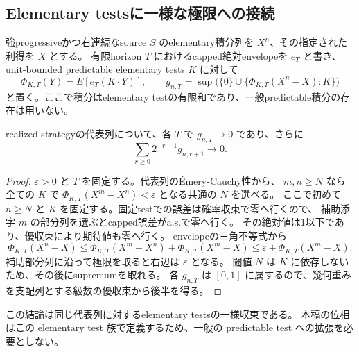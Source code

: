\subsection{Elementary testsに一様な極限への接続}

強progressiveかつ右連続なsource $S$ のelementary積分列を $X^n$、その指定された利得を $X$ とする。
有限horizon $T$ におけるcapped絶対envelopeを $e_T$ と書き、
unit-bounded predictable elementary tests $K$ に対して
\[
 \Phi_{K,T}(Y)=E[e_T(K\mathbin{\cdot}Y)],\qquad
 g_{n,T}=\sup\bigl(\{0\}\cup\{\Phi_{K,T}(X^n-X):K\}\bigr)
\]
と置く。ここで積分はelementary testの有限和であり、一般predictable積分の存在は用いない。

\begin{lemma}[Cauchy性と固定test極限から一様極限へ]
realized strategyの代表列について、各 $T$ で $g_{n,T}\to0$ であり、さらに
\[
 \sum_{r\ge0}2^{-r-1}g_{n,r+1}\longrightarrow0.
\]
\end{lemma}

\begin{proof}
$\varepsilon>0$ と $T$ を固定する。代表列のÉmery-Cauchy性から、
$m,n\ge N$ なら全ての $K$ で
$\Phi_{K,T}(X^m-X^n)<\varepsilon$ となる共通の $N$ を選べる。
ここで初めて $n\ge N$ と $K$ を固定する。固定testでの誤差は確率収束で零へ行くので、
補助添字 $m$ の部分列を選ぶとcapped誤差がa.s.で零へ行く。
その絶対値は1以下であり、優収束により期待値も零へ行く。
envelopeの三角不等式から
\[
 \Phi_{K,T}(X^n-X)
 \le\Phi_{K,T}(X^m-X^n)+\Phi_{K,T}(X^m-X)
 \le\varepsilon+\Phi_{K,T}(X^m-X).
\]
補助部分列に沿って極限を取ると右辺は $\varepsilon$ となる。
閾値 $N$ は $K$ に依存しないため、その後にsupremumを取れる。
各 $g_{n,T}$ は $[0,1]$ に属するので、幾何重みを支配列とする級数の優収束から後半を得る。
\end{proof}

この結論は同じ代表列に対するelementary testsの一様収束である。
本稿の位相はこの elementary test 族で定義するため、一般の predictable test への拡張を必要としない。
